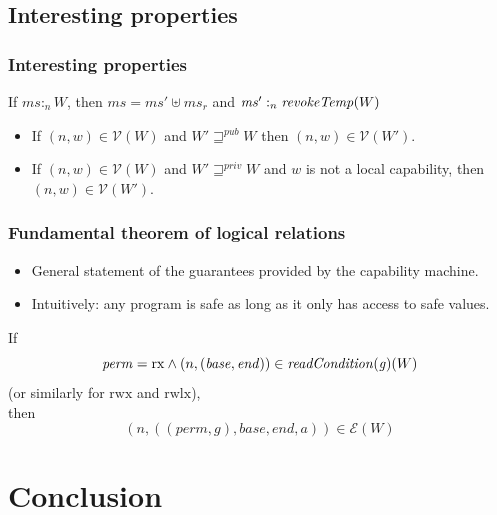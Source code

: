 \documentclass{beamer}
\newcommand{\var}[1]{\mathit{#1}}
\newcommand{\hs}{\var{ms}}
\newcommand{\gl}{\var{g}}
\newcommand{\addr}{\var{a}}
\newcommand{\start}{\var{base}}
\newcommand{\addrend}{\var{end}}
\newcommand{\heap}{\var{mem}}
\newcommand{\perm}{\var{perm}}
\newcommand{\plainfun}[2]{
  \ifthenelse{\equal{#2}{}}
  {\mathit{#1}}
  {\mathit{#1}(#2)}
}
\newcommand{\readCond}[1]{\plainfun{readCondition}{#1}}
\newcommand{\revokeTemp}[1]{\plainfun{revokeTemp}{#1}}
\newcommand{\futurewk}{\mathbin{\sqsupseteq}^{\var{pub}}}
\newcommand{\futurestr}{\mathbin{\sqsupseteq}^{\var{priv}}}
\newcommand{\heapSat}[3][\heap]{#1 :_{#2} #3}
\newcommand{\asmType}{\plaindom{AsmType}}
\newcommand{\plaindom}[1]{\mathrm{#1}}
\newcommand{\intr}[2]{\mathcal{#1}}
\newcommand{\valueintr}[1]{\intr{V}{#1}}
\newcommand{\exprintr}[1]{\intr{E}{#1}}
\newcommand{\stdvr}{\valueintr{\asmType}}
\newcommand{\stder}{\exprintr{\asmType}}
\newcommand{\npair}[2][n]{\left(#1,#2 \right)}
\newcommand{\plainperm}[1]{\mathrm{#1}}
\newcommand{\exec}{\plainperm{rx}}
\newcommand{\rwx}{\plainperm{rwx}}
\newcommand{\rwlx}{\plainperm{rwlx}}
\begin{document}
\subsection{Interesting properties}
\begin{frame}
  \frametitle{Interesting properties}
  
  \begin{lemma}
    If $\heapSat[\hs]{n}{W}$, then $\hs = \hs' \uplus \hs_r$ and
    $\heapSat[\hs']{n}{\revokeTemp{W}}$
  \end{lemma}
  \pause
  \begin{lemma}
    \begin{itemize}
    \item If $\npair{w} \in \stdvr(W)$ and $W' \futurewk W$ then $\npair{w} \in
      \stdvr(W')$.
    \item If $\npair{w} \in \stdvr(W)$ and $W' \futurestr W$ and $w$ is
      not a local capability, then $\npair{w} \in \stdvr(W')$.
    \end{itemize}
  \end{lemma}
\end{frame}

\begin{frame}
  \frametitle{Fundamental theorem of logical relations}
  \begin{itemize}
  \item General statement of the guarantees provided by the capability machine.
  \item Intuitively: any program is safe as long as it only has access to safe values.
  \end{itemize}
  \begin{theorem}[FTLR]
    If \[
      \perm = \exec \land \npair{(\start,\addrend)} \in \readCond{}(\gl)(W)
    \]
    (or similarly for $\rwx$ and $\rwlx$),\\
    then
    \[
      \npair{((\perm,\gl),\start,\addrend,\addr)} \in \stder(W)
    \]
  \end{theorem}
\end{frame}

\section{Conclusion}
\end{document}
